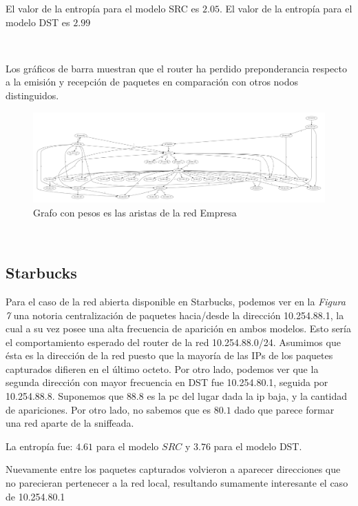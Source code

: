 El valor de la entropía para el modelo SRC es $2.05$. El valor de la entropía para 
el modelo DST es $2.99$


~

Los gráficos de barra muestran que el router ha perdido preponderancia respecto a la emisión
y recepción de paquetes en comparación con otros nodos distinguidos.

\begin{figure}[H]
	\center
	\includegraphics[scale = 0.18]{resultados/empresa/conectividad.pdf}
	\caption{Grafo con pesos es las aristas de la red Empresa}
\end{figure}

~

\subsection{Starbucks}

Para el caso de la red abierta disponible en Starbucks, podemos ver en la 
\emph{Figura 7} una notoria centralizaci\'on de paquetes hacia/desde la direcci\'on
10.254.88.1, la cual a su vez posee una alta frecuencia de aparici\'on en ambos
modelos. Esto ser\'ia el comportamiento esperado del router de la red
10.254.88.0/24. Asumimos que \'esta es la direcci\'on de la red puesto que 
la mayor\'ia de las IPs de los paquetes capturados difieren en el \'ultimo octeto.
Por otro lado, podemos ver que la segunda direcci\'on con mayor frecuencia en DST
fue 10.254.80.1, seguida por 10.254.88.8. Suponemos que $88.8$ es la pc del lugar
dada la ip baja, y la cantidad de apariciones. Por otro lado, no sabemos que es
$80.1$ dado que parece formar una red aparte de la sniffeada.

La entrop\'ia fue: $4.61$ para el modelo $SRC$ y $3.76$ para el modelo
DST.

Nuevamente entre los paquetes capturados volvieron a aparecer direcciones que
no parecieran pertenecer a la red local, resultando sumamente interesante el caso
de 10.254.80.1


